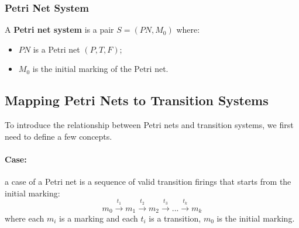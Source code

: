\subsubsection*{Petri Net System}
A \textbf{Petri net system} is a pair \(S = (PN, M_0)\) where:
\begin{itemize}
    \item \(PN\) is a Petri net \( (P, T, F) \);
    \item \(M_0\) is the initial marking of the Petri net.
\end{itemize}

\subsection{Mapping Petri Nets to Transition Systems}
To introduce the relationship between Petri nets and transition systems, we first need to define a few concepts.
\paragraph{Case:} a case of a Petri net is a sequence of valid transition firings that starts from the initial marking:
\[ m_0 \xrightarrow{t_1} m_1 \xrightarrow{t_2} m_2 \xrightarrow{t_3} ... \xrightarrow{t_k} m_k \]
where each \(m_i\) is a marking and each \(t_i\) is a transition, $m_0$ is the initial marking.
